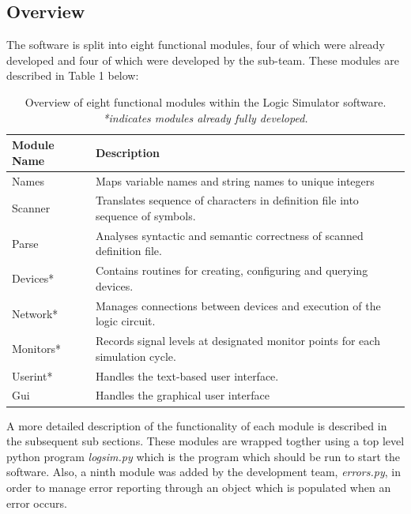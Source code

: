 \documentclass{article}					%
\begin{document}
\subsection{Overview}
The software is split into eight functional modules, four of which were already developed and four of which were developed by the sub-team. These modules are described in Table 1 below:
\begin{table}[h]
\begin{centering}
\begin{tabular}{l|l}
Module Name & Description                                                                    \\ \hline
Names       & Maps variable names and string names to unique integers                        \\
Scanner     & Translates sequence of characters in definition file into sequence of symbols. \\
Parse       & Analyses syntactic and semantic correctness of scanned definition file.        \\
Devices*    & Contains routines for creating, configuring and querying devices.              \\
Network*    & Manages connections between devices and execution of the logic circuit.        \\
Monitors*   & Records signal levels at designated monitor points for each simulation cycle.  \\
Userint*    & Handles the text-based user interface.                                         \\
Gui         & Handles the graphical user interface
\end{tabular}
\caption{Overview of eight functional modules within the Logic Simulator software. \textit{*indicates modules already fully developed.}}
\end{centering}
\end{table}

A more detailed description of the functionality of each module is described in the subsequent sub sections. These modules are wrapped togther using a top level python program \textit{logsim.py} which is the program which should be run to start the software. Also, a ninth module was added by the development team, \textit{errors.py}, in order to manage error reporting through an object which is populated when an error occurs.
\end{document}
